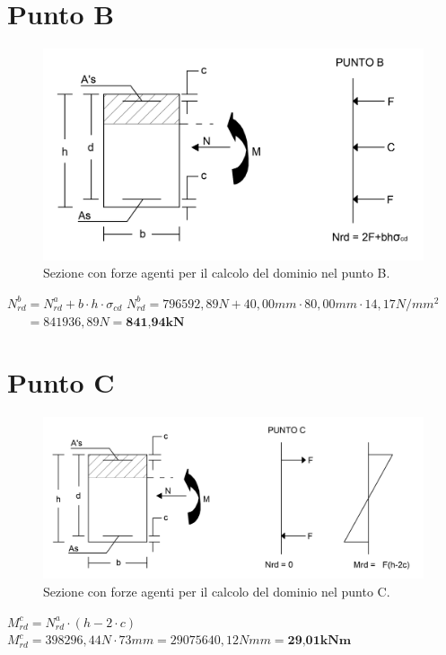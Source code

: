 \documentclass[a4paper,12pt, oneside]{book}
\begin{document}
    \section{Punto B}
    \begin{figure}[H]
    	\centering
    	\includegraphics[width=0.7\linewidth]{"immagini/dominio B"}
    	\caption{Sezione con forze agenti per il calcolo del dominio nel punto B.}
    	\label{fig:dominio-b}
    \end{figure}
    
    $N_{rd}^{b}=N_{rd}^{a}+b\cdot h\cdot \sigma_{cd}$
    \leavevmode\newline
    \leavevmode\newline
    $N_{rd}^{b}=796592,89N+40,00mm\cdot 80,00mm\cdot 14,17N/mm^2$
    \leavevmode\newline
    $\phantom{N_{rd}^{b}}=841936,89N=\textbf{841,94kN}$
    
    \section{Punto C}
    \begin{figure}[H]
    	\centering
    	\includegraphics[width=0.88\linewidth]{"immagini/dominio C"}
    	\caption{Sezione con forze agenti per il calcolo del dominio nel punto C.}
    	\label{fig:dominio-c}
    \end{figure}
    
    $M_{rd}^{c}=N_{rd}^{a}\cdot(h-2\cdot c)$
    \leavevmode\newline
    \leavevmode\newline
    $M_{rd}^{c}=398296,44N\cdot 73mm=29075640,12Nmm=\textbf{29,01kNm}$
    
\end{document}
